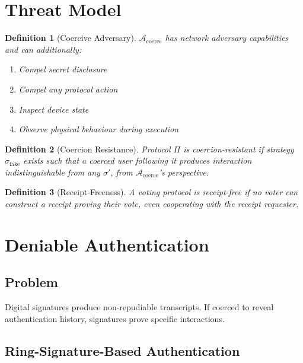 \documentclass[11pt,a4paper]{article}
\newtheorem{definition}{Definition}[section]
\begin{document}
\section{Threat Model}
\label{sec:threat}

\begin{definition}[Coercive Adversary]
    $\mathcal{A}_{\mathrm{coerce}}$ has network adversary capabilities
    and can additionally:
    \begin{enumerate}[label=(\alph*)]
        \item Compel secret disclosure
        \item Compel any protocol action
        \item Inspect device state
        \item Observe physical behaviour during execution
    \end{enumerate}
\end{definition}

\begin{definition}[Coercion Resistance]
    Protocol $\Pi$ is coercion-resistant if strategy
    $\sigma_{\mathrm{fake}}$ exists such that a coerced user following it
    produces interaction indistinguishable from any $\sigma'$, from
    $\mathcal{A}_{\mathrm{coerce}}$'s perspective.
\end{definition}

\begin{definition}[Receipt-Freeness]
    A voting protocol is receipt-free if no voter can construct a receipt
    proving their vote, even cooperating with the receipt requester.
\end{definition}

\section{Deniable Authentication}
\label{sec:deniable-auth}

\subsection{Problem}

Digital signatures produce non-repudiable transcripts.  If coerced to
reveal authentication history, signatures prove specific interactions.

\subsection{Ring-Signature-Based Authentication}
\end{document}
